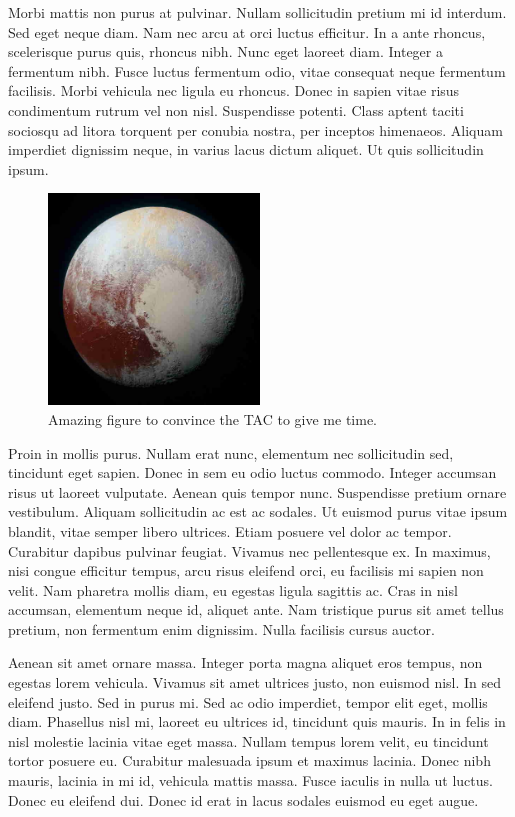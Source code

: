 \documentclass{lowell-prop}
\begin{document}
Morbi mattis non purus at pulvinar. Nullam sollicitudin pretium mi id interdum. Sed eget neque diam. Nam nec arcu at orci luctus efficitur. In a ante rhoncus, scelerisque purus quis, rhoncus nibh. Nunc eget laoreet diam. Integer a fermentum nibh. Fusce luctus fermentum odio, vitae consequat neque fermentum facilisis. Morbi vehicula nec ligula eu rhoncus. Donec in sapien vitae risus condimentum rutrum vel non nisl. Suspendisse potenti. Class aptent taciti sociosqu ad litora torquent per conubia nostra, per inceptos himenaeos. Aliquam imperdiet dignissim neque, in varius lacus dictum aliquet. Ut quis sollicitudin ipsum.

 \begin{figure}
   \includegraphics[width=0.5\textwidth]{pluto-small.eps} %
      \caption{Amazing figure to convince the TAC to give me time.}\label{fig:name}
 \end{figure}


Proin in mollis purus. Nullam erat nunc, elementum nec sollicitudin sed, tincidunt eget sapien. Donec in sem eu odio luctus commodo. Integer accumsan risus ut laoreet vulputate. Aenean quis tempor nunc. Suspendisse pretium ornare vestibulum. Aliquam sollicitudin ac est ac sodales. Ut euismod purus vitae ipsum blandit, vitae semper libero ultrices. Etiam posuere vel dolor ac tempor. Curabitur dapibus pulvinar feugiat. Vivamus nec pellentesque ex. In maximus, nisi congue efficitur tempus, arcu risus eleifend orci, eu facilisis mi sapien non velit. Nam pharetra mollis diam, eu egestas ligula sagittis ac. Cras in nisl accumsan, elementum neque id, aliquet ante. Nam tristique purus sit amet tellus pretium, non fermentum enim dignissim. Nulla facilisis cursus auctor.

Aenean sit amet ornare massa. Integer porta magna aliquet eros tempus, non egestas lorem vehicula. Vivamus sit amet ultrices justo, non euismod nisl. In sed eleifend justo. Sed in purus mi. Sed ac odio imperdiet, tempor elit eget, mollis diam. Phasellus nisl mi, laoreet eu ultrices id, tincidunt quis mauris. In in felis in nisl molestie lacinia vitae eget massa. Nullam tempus lorem velit, eu tincidunt tortor posuere eu. Curabitur malesuada ipsum et maximus lacinia. Donec nibh mauris, lacinia in mi id, vehicula mattis massa. Fusce iaculis in nulla ut luctus. Donec eu eleifend dui. Donec id erat in lacus sodales euismod eu eget augue.
\end{document}
